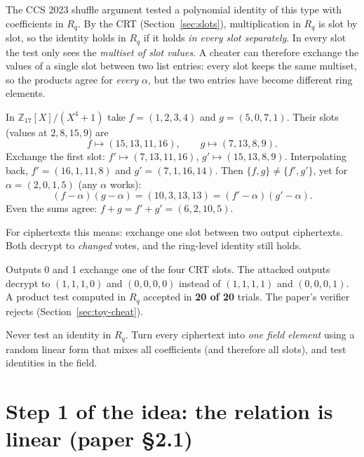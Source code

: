 \documentclass[11pt,a4paper]{article}
\newcommand{\Z}{\mathbb{Z}}
\newcommand{\Rq}{R_q}
\theoremstyle{definition}
\theoremstyle{plain}
\begin{document}
The CCS 2023 shuffle argument tested a polynomial identity of this type with coefficients in $\Rq$.
By the CRT (Section~\ref{sec:slots}), multiplication in $\Rq$ is slot by slot, so the identity holds in
$\Rq$ if it holds \emph{in every slot separately}. In every slot the test only sees the
\emph{multiset of slot values}. A cheater can therefore exchange the values of a single slot between
two list entries: every slot keeps the same multiset, so the products agree for \emph{every} $\alpha$,
but the two entries have become different ring elements.

\begin{example}
In $\Z_{17}[X]/(X^4+1)$ take $f=(1,2,3,4)$ and $g=(5,0,7,1)$. Their slots (values at $2,8,15,9$) are
\[
  f\mapsto(15,13,11,16),\qquad g\mapsto(7,13,8,9).
\]
Exchange the first slot: $f'\mapsto(7,13,11,16)$, $g'\mapsto(15,13,8,9)$. Interpolating back,
$f'=(16,1,11,8)$ and $g'=(7,1,16,14)$. Then $\{f,g\}\neq\{f',g'\}$, yet for $\alpha=(2,0,1,5)$ (any
$\alpha$ works):
\[
  (f-\alpha)(g-\alpha)=(10,3,13,13)=(f'-\alpha)(g'-\alpha).
\]
Even the sums agree: $f+g=f'+g'=(6,2,10,5)$.
\end{example}

For ciphertexts this means: exchange one slot between two output ciphertexts. Both decrypt to
\emph{changed} votes, and the ring-level identity still holds.

\begin{toyrun}
Outputs 0 and 1 exchange one of the four CRT slots. The attacked outputs decrypt to $(1,1,1,0)$ and
$(0,0,0,0)$ instead of $(1,1,1,1)$ and $(0,0,0,1)$. A product test computed in $\Rq$ accepted in
\textbf{20 of 20} trials. The paper's verifier rejects (Section~\ref{sec:toy-cheat}).
\end{toyrun}

\begin{why}
Never test an identity in $\Rq$. Turn every ciphertext into \emph{one field element} using a random
linear form that mixes all coefficients (and therefore all slots), and test identities in the field.
\end{why}

\section{Step 1 of the idea: the relation is linear (paper \S2.1)}
\label{sec:linear}
\end{document}
